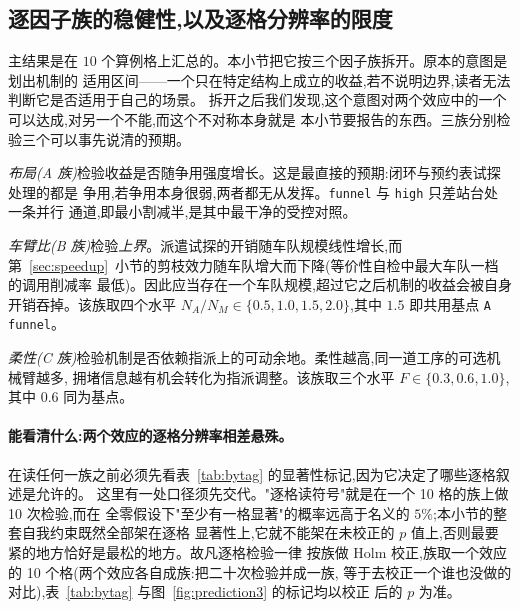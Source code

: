 \documentclass[manuscript,screen,review]{acmart}
\newcommand{\NCases}{10}
\begin{document}

\subsection{逐因子族的稳健性,以及逐格分辨率的限度}
\label{sec:whichcongestion}

主结果是在 $\NCases$ 个算例格上汇总的。本小节把它按三个因子族拆开。原本的意图是划出机制的
适用区间——一个只在特定结构上成立的收益,若不说明边界,读者无法判断它是否适用于自己的场景。
拆开之后我们发现,这个意图对两个效应中的一个可以达成,对另一个不能,而这个不对称本身就是
本小节要报告的东西。三族分别检验三个可以事先说清的预期。

\emph{布局(A 族)}检验收益是否随争用强度增长。这是最直接的预期:闭环与预约表试探处理的都是
争用,若争用本身很弱,两者都无从发挥。\texttt{funnel} 与 \texttt{high} 只差站台处一条并行
通道,即最小割减半,是其中最干净的受控对照。

\emph{车臂比(B 族)}检验\emph{上界}。派遣试探的开销随车队规模线性增长,而
第~\ref{sec:speedup}~小节的剪枝效力随车队增大而下降(等价性自检中最大车队一档的调用削减率
最低)。因此应当存在一个车队规模,超过它之后机制的收益会被自身开销吞掉。该族取四个水平
$N_A/N_M\in\{0.5,1.0,1.5,2.0\}$,其中 $1.5$ 即共用基点 \texttt{A funnel}。

\emph{柔性(C 族)}检验机制是否依赖指派上的可动余地。柔性越高,同一道工序的可选机械臂越多,
拥堵信息越有机会转化为指派调整。该族取三个水平 $F\in\{0.3,0.6,1.0\}$,其中 $0.6$ 同为基点。

\paragraph{能看清什么:两个效应的逐格分辨率相差悬殊。}
在读任何一族之前必须先看表~\ref{tab:bytag} 的显著性标记,因为它决定了哪些逐格叙述是允许的。
这里有一处口径须先交代。"逐格读符号"就是在一个 \NCases{} 格的族上做 \NCases{} 次检验,而在
全零假设下"至少有一格显著"的概率远高于名义的 $5\%$;本小节的整套自我约束既然全部架在逐格
显著性上,它就不能架在未校正的 $p$ 值上,否则最要紧的地方恰好是最松的地方。故凡逐格检验一律
按族做 Holm 校正,族取一个效应的 \NCases{} 个格(两个效应各自成族:把二十次检验并成一族,
等于去校正一个谁也没做的对比),表~\ref{tab:bytag} 与图~\ref{fig:prediction3} 的标记均以校正
后的 $p$ 为准。
\end{document}
